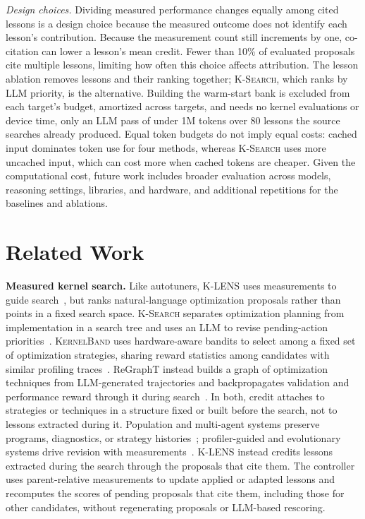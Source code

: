 \documentclass[acmsmall,screen,review,anonymous,nonacm]{acmart}
\newcommand{\klens}{\textsc{K-LENS}\xspace}
\newcommand{\ksearch}{\textsc{K-Search}\xspace}
\newcommand{\kernelband}{\textsc{KernelBand}\xspace}
\begin{document}
\emph{Design choices.} Dividing measured performance changes equally among cited
lessons is a design choice because the measured outcome does not identify each
lesson's contribution. Because the measurement count still increments by one,
co-citation can lower a lesson's mean credit. Fewer than 10\% of evaluated proposals cite multiple
lessons, limiting how often this choice affects attribution. The lesson ablation
removes lessons and their ranking together; \ksearch, which ranks by LLM
priority, is the alternative.
Building the warm-start bank is excluded from each target's budget, amortized
across targets, and needs no kernel evaluations or device time, only an LLM pass of
under 1M tokens over 80 lessons the source searches already produced. Equal token budgets do not imply equal costs: cached input dominates
token use for four methods, whereas \ksearch uses more uncached
input, which can cost more when cached tokens are cheaper. Given the
computational cost, future work includes broader evaluation across models,
reasoning settings, libraries, and hardware, and additional repetitions for the
baselines and ablations.


\section{Related Work}

\noindent\textbf{Measured kernel search.}
Like autotuners, \klens uses measurements to guide
search~\citep{Ansel2014OpenTuner,Chen2018Learning,Zheng2020Ansor,Adams2019Halide},
but ranks natural-language optimization proposals rather than points in a fixed
search space.
\ksearch separates optimization planning from implementation in a search tree and
uses an LLM to revise pending-action priorities~\citep{Cao2026K}.
\kernelband uses hardware-aware bandits to select among a fixed set of
optimization strategies, sharing reward statistics among candidates with similar
profiling traces~\citep{Ran2025KernelBand}. ReGraphT instead builds a graph of
optimization techniques from LLM-generated trajectories and backpropagates
validation and performance reward through it during search~\citep{Gong2025From}.
In both, credit attaches to strategies or techniques in a structure fixed or
built before the search, not to lessons extracted during it. Population and multi-agent systems
preserve programs, diagnostics, or strategy
histories~\citep{Chen2025cuPilot,Sun2026KernelSkill,Gai2026Optimizing,Novikov2025AlphaEvolve,Sharma2025OpenEvolve,Liao2025KernelEvolve};
profiler-guided and evolutionary systems drive revision with
measurements~\citep{Lei2025PRAGMA,Guo2025EvoEngineer,Du2026Kernel}.
\klens instead credits lessons extracted during the search through the proposals
that cite them. The controller uses parent-relative measurements to update applied
or adapted lessons and recomputes the scores of pending proposals that cite them,
including those for other candidates, without regenerating proposals or
LLM-based rescoring.
\end{document}
